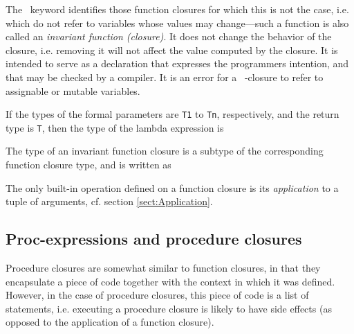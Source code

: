 The \kwConst~keyword identifies those function closures for which this
is not the case, i.e. which do not refer to variables whose values may
change---such a function is also called an {\em invariant function (closure)}.
It does not change the behavior of the closure, i.e.  removing it will
not affect the value computed by the closure. It is intended to serve
as a declaration that expresses the programmers intention, and that
may be checked by a compiler. It is an error for a
\kwConst~\kwLambda-closure to refer to assignable or mutable
variables.


If the types of the formal parameters are {\tt T1} to {\tt Tn},
respectively, and the return type is {\tt T}, then the type of the
lambda expression is \\
\exindent{\tt [T1, ..., Tn --> T]}

The type of an invariant function closure is a subtype of the
corresponding function closure type, and is written as\\


The only built-in operation defined on a function closure is its {\em
  application} to a tuple of arguments, cf. section \ref{sect:Application}. 



\subsection{Proc-expressions and procedure
  closures}\label{sect:ProcClosures}




Procedure closures are somewhat similar to function closures, in that
they encapsulate a piece of code together with the context in which it
was defined.  However, in the case of procedure closures, this piece
of code is a list of statements, i.e. executing a procedure closure is likely to have
side effects (as opposed to the application of a function closure).

